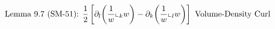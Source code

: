 \documentclass[preview]{standalone}
\begin{document}
\begin{align*}
\special{dvisvgm:raw <g id='unique000'>}\text{Lemma 9.7 (SM-51): }\frac{1}{2}\left[\partial_l\!\left(\frac{1}{w}\llcorner_k w\right) - \partial_k\!\left(\frac{1}{w}\llcorner_l w\right)\right]\text{ Volume-Density Curl}\special{dvisvgm:raw </g>}
\end{align*}
\end{document}
